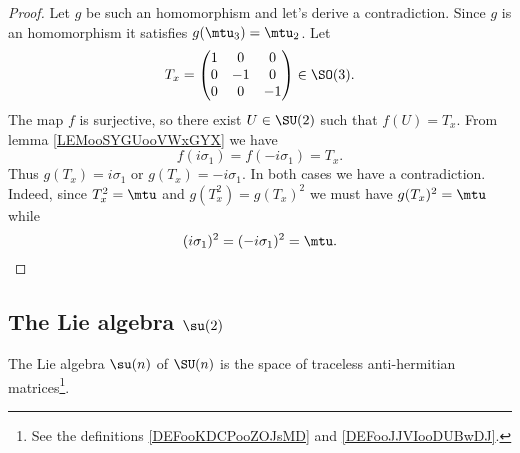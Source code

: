 \begin{proof}
    Let \( g\) be such an homomorphism and let's derive a contradiction. Since \( g\) is an homomorphism it satisfies \( g(\mtu_3)=\mtu_2\). Let 
    \begin{equation}
        T_x=\begin{pmatrix}
            1    &   0    &   0    \\
            0    &   -1    &   0    \\
            0    &   0    &   -1
        \end{pmatrix}\in \SO(3).
    \end{equation}
    The map \( f\) is surjective, so there exist \( U\in \SU(2)\) such that \( f(U)=T_x\). From lemma \ref{LEMooSYGUooVWxGYX} we have
    \begin{equation}
        f(i\sigma_1)=f(-i\sigma_1)=T_x.
    \end{equation}
    Thus \( g(T_x)=i\sigma_1\) or \( g(T_x)=-i\sigma_1\). In both cases we have a contradiction. Indeed, since \( T_x^2=\mtu\) and \( g(T_x^2)=g(T_x)^2\) we must have \( g(T_x)^2=\mtu\) while
    \begin{equation}
        (i\sigma_1)^2=(-i\sigma_1)^2=\mtu.
    \end{equation}
\end{proof}

\subsection{The Lie algebra \texorpdfstring{\( \su(2)\)}{su(2)}}

\begin{proposition}\label{PROPooSERWooFtxBgV}
    The Lie algebra \( \su(n)\) of \( \SU(n)\) is the space of traceless anti-hermitian matrices\footnote{See the definitions \ref{DEFooKDCPooZOJsMD} and \ref{DEFooJJVIooDUBwDJ}.}.
\end{proposition}

